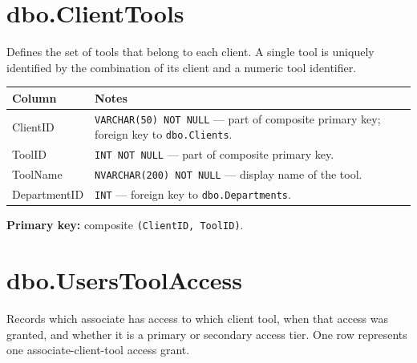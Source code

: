 \documentclass[12pt,a4paper]{report}
\begin{document}
\section{dbo.ClientTools}

Defines the set of tools that belong to each client. A single tool is uniquely identified by
the combination of its client and a numeric tool identifier.

\begin{longtable}{>{\ttfamily}p{4.5cm} >{\raggedright\arraybackslash}p{9.5cm}}
\toprule
\normalfont\textbf{Column} & \textbf{Notes} \\
\midrule
\endhead
ClientID     & \texttt{VARCHAR(50) NOT NULL} — part of composite primary key;
               foreign key to \texttt{dbo.Clients}. \\
ToolID       & \texttt{INT NOT NULL} — part of composite primary key. \\
ToolName     & \texttt{NVARCHAR(200) NOT NULL} — display name of the tool. \\
DepartmentID & \texttt{INT} — foreign key to \texttt{dbo.Departments}. \\
\bottomrule
\end{longtable}

\textbf{Primary key:} composite \texttt{(ClientID, ToolID)}.

\section{dbo.UsersToolAccess}

Records which associate has access to which client tool, when that access was granted, and
whether it is a primary or secondary access tier. One row represents one
associate-client-tool access grant.
\end{document}
